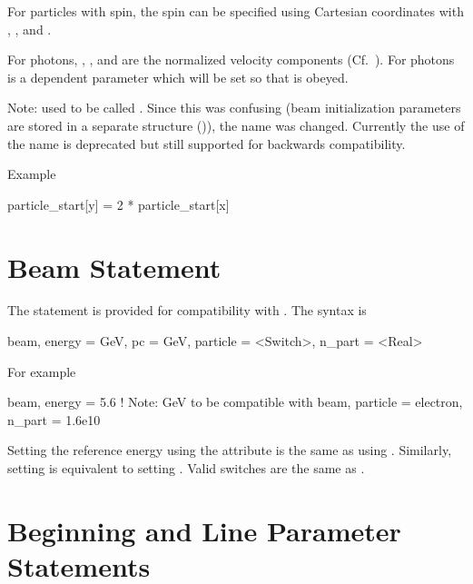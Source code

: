 For particles with spin, the spin can be specified using Cartesian coordinates with ,
, and .

For photons, , , and  are the normalized velocity components
(Cf.~). For photons  is a dependent parameter which will be set so that 
is obeyed.

Note:  used to be called . Since this was confusing (beam
initialization parameters are stored in a separate  structure
()), the name was changed. Currently the use of the  name
is deprecated but still supported for backwards compatibility.

Example
\begin{example}
  particle_start[y] = 2 * particle_start[x]
\end{example}

\section{Beam Statement}
\label{s:beam.mad}

The  statement is provided for compatibility with \mad. The syntax is
\begin{example}
  beam, energy = GeV, pc = GeV, particle = <Switch>, n_part = <Real>
\end{example}
For example
\begin{example}
  beam, energy = 5.6  ! Note: GeV to be compatible with \mad
  beam, particle = electron, n_part = 1.6e10
\end{example}
Setting the reference energy using the  attribute is the
same as using . Similarly, setting  is
equivalent to setting . Valid  switches
are the same as .

\section{Beginning and Line Parameter Statements}
\label{s:beginning}

